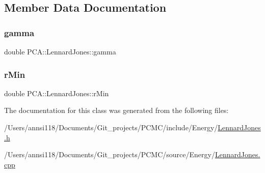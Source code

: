 \subsection{Member Data Documentation}
\hypertarget{class_p_c_a_1_1_lennard_jones_ad28ea138038c2c43e9fd000752ea6130}{}\label{class_p_c_a_1_1_lennard_jones_ad28ea138038c2c43e9fd000752ea6130} 
\subsubsection{\texorpdfstring{gamma}{gamma}}
{\footnotesize\ttfamily double P\+C\+A\+::\+Lennard\+Jones\+::gamma\hspace{0.3cm}{\ttfamily [private]}}

\hypertarget{class_p_c_a_1_1_lennard_jones_aa59f5f2bb7cf5c83a33a7f95d23ef4c8}{}\label{class_p_c_a_1_1_lennard_jones_aa59f5f2bb7cf5c83a33a7f95d23ef4c8} 
\subsubsection{\texorpdfstring{r\+Min}{rMin}}
{\footnotesize\ttfamily double P\+C\+A\+::\+Lennard\+Jones\+::r\+Min\hspace{0.3cm}{\ttfamily [private]}}



The documentation for this class was generated from the following files\+:\begin{DoxyCompactItemize}
\item 
/\+Users/annsi118/\+Documents/\+Git\+\_\+projects/\+P\+C\+M\+C/include/\+Energy/\hyperlink{_lennard_jones_8h}{Lennard\+Jones.\+h}\item 
/\+Users/annsi118/\+Documents/\+Git\+\_\+projects/\+P\+C\+M\+C/source/\+Energy/\hyperlink{_lennard_jones_8cpp}{Lennard\+Jones.\+cpp}\end{DoxyCompactItemize}
